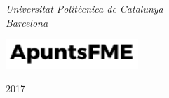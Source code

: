 \begin{titlepage}
	\vspace{5.5\baselineskip} %

	\textit{Universitat Politècnica de Catalunya \\ Barcelona} %

	\vfill %


	\includegraphics[width=5cm]{../logo.pdf}

	\vspace{0.3\baselineskip} %

	2017 %


\end{titlepage}
